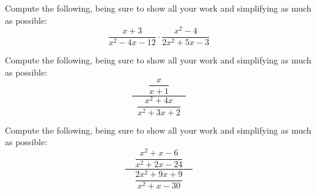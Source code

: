 \documentclass[11pt,letterpaper]{article}
\begin{document}
\newpage





 Compute the following, being sure to show all your work and simplifying as much as possible:
	\[
	\dfrac{x + 3}{x^2 - 4x - 12} \cdot \dfrac{x^2 - 4}{2x^2 + 5x - 3}
	\] \pspace





\newpage





 Compute the following, being sure to show all your work and simplifying as much as possible:
	\[
	\dfrac{\phantom{.}\;\;\;\;\;\;\dfrac{x}{x + 1}\;\;\;\;\;\;\phantom{.}}{\dfrac{x^2 + 4x}{x^2 + 3x + 2}}
	\] \pspace





\newpage





 Compute the following, being sure to show all your work and simplifying as much as possible:
	\[
	\dfrac{\phantom{.}\;\;\;\dfrac{x^2 + x - 6}{x^2 + 2x - 24}\;\;\;\phantom{.}}{\dfrac{2x^2 + 9x + 9}{x^2 + x - 30}}
	\] \pspace


\end{document}
